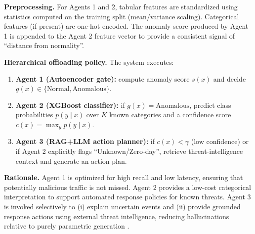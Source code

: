 \textbf{Preprocessing.} For Agents 1 and 2, tabular features are standardized using statistics computed on the training split (mean/variance scaling). Categorical features (if present) are one-hot encoded. The anomaly score produced by Agent 1 is appended to the Agent 2 feature vector to provide a consistent signal of ``distance from normality''.

\textbf{Hierarchical offloading policy.} The system executes:
\begin{enumerate}
  \item \textbf{Agent 1 (Autoencoder gate):} compute anomaly score $s(x)$ and decide $g(x)\in\{\text{Normal},\text{Anomalous}\}$.
  \item \textbf{Agent 2 (XGBoost classifier):} if $g(x)=\text{Anomalous}$, predict class probabilities $p(y\mid x)$ over $K$ known categories and a confidence score $c(x)=\max_y p(y\mid x)$.
  \item \textbf{Agent 3 (RAG+LLM action planner):} if $c(x)<\gamma$ (low confidence) or if Agent 2 explicitly flags ``Unknown/Zero-day'', retrieve threat-intelligence context and generate an action plan.
\end{enumerate}

\textbf{Rationale.} Agent 1 is optimized for high recall and low latency, ensuring that potentially malicious traffic is not missed. Agent 2 provides a low-cost categorical interpretation to support automated response policies for known threats. Agent 3 is invoked selectively to (i) explain uncertain events and (ii) provide grounded response actions using external threat intelligence, reducing hallucinations relative to purely parametric generation \cite{Lewis2020RAG}.

